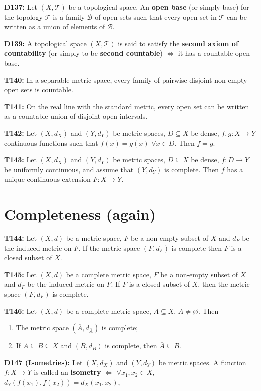 \documentclass[twocolumn,10pt]{article}
\begin{document}
\textbf{D137:} Let $(X,\mathcal{T})$ be a topological space. An \textbf{open base} (or simply base) for the topology $\mathcal{T}$ is a family $\mathcal{B}$ of open sets such that every open set in $\mathcal{T}$ can be written as a union of elements of $\mathcal{B}$.


\textbf{D139:} A topological space $(X,\mathcal{T})$ is said to satisfy the \textbf{second axiom of countability} (or simply to be \textbf{second countable}) $\Leftrightarrow$ it has a countable open base.


\textbf{T140:} In a separable metric space, every family of pairwise disjoint non-empty open sets is countable.


\textbf{T141:} On the real line with the standard metric, every open set can be written as a countable union of disjoint open intervals.

\textbf{T142:} Let $(X,d_X)$ and $(Y,d_Y)$ be metric spaces, $D\subseteq X$ be dense, $f,g:X\to Y$ continuous functions such that $f(x)=g(x)$ $\forall x\in D$. Then $f=g$.


\textbf{T143:} Let $(X,d_X)$ and $(Y,d_Y)$ be metric spaces, $D\subseteq X$ be dense, $f:D\to Y$ be uniformly continuous, and assume that $(Y,d_Y)$ is complete. Then $f$ has a unique continuous extension $F:X\to Y$.

\section{Completeness (again)}

\textbf{T144:} Let $(X,d)$ be a metric space, $F$ be a non-empty subset of $X$ and $d_F$ be the induced metric on $F$. If the metric space $(F,d_F)$ is complete then $F$ is a closed subset of $X$.

\textbf{T145:} Let $(X,d)$ be a complete metric space, $F$ be a non-empty subset of $X$ and $d_F$ be the induced metric on $F$. If $F$ is a closed subset of $X$, then the metric space $(F,d_F)$ is complete.


\textbf{T146:} Let $(X,d)$ be a complete metric space, $A\subseteq X$, $A\neq\varnothing$. Then
\begin{enumerate}
    \item The metric space $(\overline{A},d_{\overline{A}})$ is complete;
    \item If $A\subseteq B\subseteq X$ and $(B,d_B)$ is complete, then $\overline{A}\subseteq B$.
\end{enumerate}
\textbf{D147 (Isometries):} Let $(X,d_X)$ and $(Y,d_Y)$ be metric spaces. A function $f:X\to Y$ is called an \textbf{isometry} $\Leftrightarrow$ $\forall x_1,x_2\in X$, $d_Y(f(x_1),f(x_2))=d_X(x_1,x_2)$,
\end{document}
